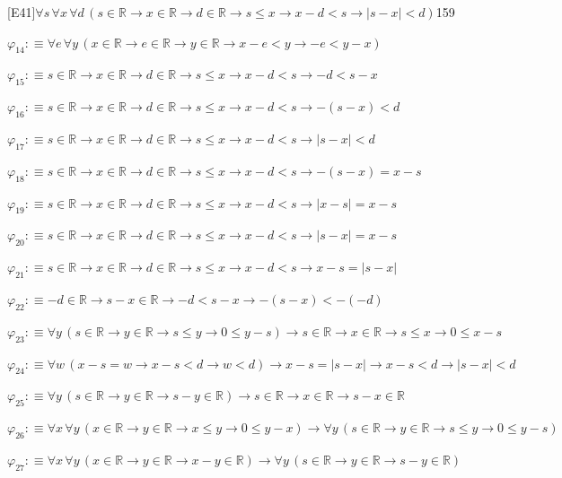 \begin{fullproof}{[E41]}{$\forall s\,\forall x\,\forall d\,(s \in \mathbb{R} \to x \in \mathbb{R} \to d \in \mathbb{R} \to s \leq x \to x - d < s \to \lvert s - x \rvert < d)$}{159}
\begin{abbrevlist}
\item $\varphi_{14} :\equiv \forall e\,\forall y\,(x \in \mathbb{R} \to e \in \mathbb{R} \to y \in \mathbb{R} \to x - e < y \to -e < y - x)$
\item $\varphi_{15} :\equiv s \in \mathbb{R} \to x \in \mathbb{R} \to d \in \mathbb{R} \to s \leq x \to x - d < s \to -d < s - x$
\item $\varphi_{16} :\equiv s \in \mathbb{R} \to x \in \mathbb{R} \to d \in \mathbb{R} \to s \leq x \to x - d < s \to -(s - x) < d$
\item $\varphi_{17} :\equiv s \in \mathbb{R} \to x \in \mathbb{R} \to d \in \mathbb{R} \to s \leq x \to x - d < s \to \lvert s - x \rvert < d$
\item $\varphi_{18} :\equiv s \in \mathbb{R} \to x \in \mathbb{R} \to d \in \mathbb{R} \to s \leq x \to x - d < s \to -(s - x) = x - s$
\item $\varphi_{19} :\equiv s \in \mathbb{R} \to x \in \mathbb{R} \to d \in \mathbb{R} \to s \leq x \to x - d < s \to \lvert x - s \rvert = x - s$
\item $\varphi_{20} :\equiv s \in \mathbb{R} \to x \in \mathbb{R} \to d \in \mathbb{R} \to s \leq x \to x - d < s \to \lvert s - x \rvert = x - s$
\item $\varphi_{21} :\equiv s \in \mathbb{R} \to x \in \mathbb{R} \to d \in \mathbb{R} \to s \leq x \to x - d < s \to x - s = \lvert s - x \rvert$
\item $\varphi_{22} :\equiv -d \in \mathbb{R} \to s - x \in \mathbb{R} \to -d < s - x \to -(s - x) < -(-d)$
\item $\varphi_{23} :\equiv \forall y\,(s \in \mathbb{R} \to y \in \mathbb{R} \to s \leq y \to 0 \leq y - s) \to s \in \mathbb{R} \to x \in \mathbb{R} \to s \leq x \to 0 \leq x - s$
\item $\varphi_{24} :\equiv \forall w\,(x - s = w \to x - s < d \to w < d) \to x - s = \lvert s - x \rvert \to x - s < d \to \lvert s - x \rvert < d$
\item $\varphi_{25} :\equiv \forall y\,(s \in \mathbb{R} \to y \in \mathbb{R} \to s - y \in \mathbb{R}) \to s \in \mathbb{R} \to x \in \mathbb{R} \to s - x \in \mathbb{R}$
\item $\varphi_{26} :\equiv \forall x\,\forall y\,(x \in \mathbb{R} \to y \in \mathbb{R} \to x \leq y \to 0 \leq y - x) \to \forall y\,(s \in \mathbb{R} \to y \in \mathbb{R} \to s \leq y \to 0 \leq y - s)$
\item $\varphi_{27} :\equiv \forall x\,\forall y\,(x \in \mathbb{R} \to y \in \mathbb{R} \to x - y \in \mathbb{R}) \to \forall y\,(s \in \mathbb{R} \to y \in \mathbb{R} \to s - y \in \mathbb{R})$

\end{abbrevlist}
\end{fullproof}
